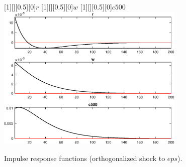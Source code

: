 \begin{figure}[H]
[1][][0.5][0]{$r$}
[1][][0.5][0]{$w$}
[1][][0.5][0]{$c500$}
\centering 
\includegraphics[width=0.80\textwidth]{DyReiter/graphs/DyReiter_IRF_eps3}
\caption{Impulse response functions (orthogonalized shock to $eps$).}\label{Fig:IRF:eps:3}
\end{figure}
 
 
